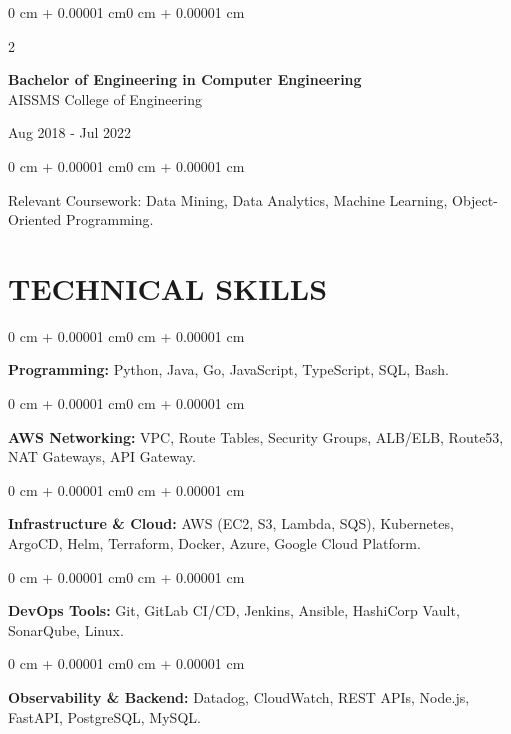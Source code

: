 \documentclass[10pt, letterpaper]{article}
\newenvironment{onecolentry}{
    \begin{adjustwidth}{0 cm + 0.00001 cm}{0 cm + 0.00001 cm}
}{
    \end{adjustwidth}
}
\newenvironment{twocolentry}[2][]{
    \onecolentry
    \def\secondColumn{#2}
    \setcolumnwidth{\fill, 4.5 cm}
    \begin{paracol}{2}
}{
    \switchcolumn \raggedleft \secondColumn
    \end{paracol}
    \endonecolentry
}
\begin{document}
\begin{twocolentry}{
    Aug 2018 - Jul 2022
}
    \textbf{Bachelor of Engineering in Computer Engineering} \\
    AISSMS College of Engineering
\end{twocolentry}
\begin{onecolentry}
Relevant Coursework: Data Mining, Data Analytics, Machine Learning, Object-Oriented Programming.
\end{onecolentry}
\section{TECHNICAL SKILLS}
\begin{onecolentry}
\textbf{Programming:} Python, Java, Go, JavaScript, TypeScript, SQL, Bash.
\end{onecolentry}
\vspace{0.06 cm}
\begin{onecolentry}
\textbf{AWS Networking:} VPC, Route Tables, Security Groups, ALB/ELB, Route53, NAT Gateways, API Gateway.
\end{onecolentry}
\vspace{0.06 cm}
\begin{onecolentry}
\textbf{Infrastructure \& Cloud:} AWS (EC2, S3, Lambda, SQS), Kubernetes, ArgoCD, Helm, Terraform, Docker, Azure, Google Cloud Platform.
\end{onecolentry}
\vspace{0.06 cm}
\begin{onecolentry}
\textbf{DevOps Tools:} Git, GitLab CI/CD, Jenkins, Ansible, HashiCorp Vault, SonarQube, Linux.
\end{onecolentry}
\vspace{0.06 cm}
\begin{onecolentry}
\textbf{Observability \& Backend:} Datadog, CloudWatch, REST APIs, Node.js, FastAPI, PostgreSQL, MySQL.
\end{onecolentry}

\end{document}
